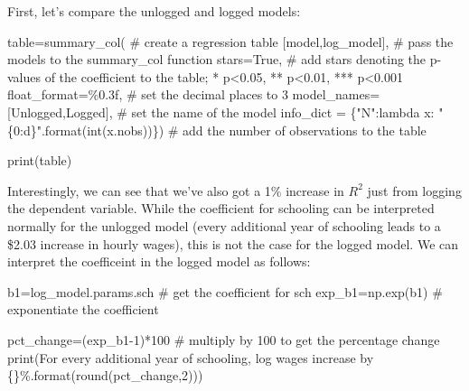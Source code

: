 \documentclass[
  letterpaper,
  DIV=11,
  numbers=noendperiod]{scrreprt}
\newenvironment{Shaded}{\begin{snugshade}}{\end{snugshade}}
\newcommand{\BuiltInTok}[1]{\textcolor[rgb]{0.00,0.23,0.31}{#1}}
\newcommand{\CommentTok}[1]{\textcolor[rgb]{0.37,0.37,0.37}{#1}}
\newcommand{\DecValTok}[1]{\textcolor[rgb]{0.68,0.00,0.00}{#1}}
\newcommand{\KeywordTok}[1]{\textcolor[rgb]{0.00,0.23,0.31}{#1}}
\newcommand{\NormalTok}[1]{\textcolor[rgb]{0.00,0.23,0.31}{#1}}
\newcommand{\OperatorTok}[1]{\textcolor[rgb]{0.37,0.37,0.37}{#1}}
\newcommand{\SpecialCharTok}[1]{\textcolor[rgb]{0.37,0.37,0.37}{#1}}
\newcommand{\StringTok}[1]{\textcolor[rgb]{0.13,0.47,0.30}{#1}}
\newcommand{\VariableTok}[1]{\textcolor[rgb]{0.07,0.07,0.07}{#1}}
\begin{document}
First, let's compare the unlogged and logged models:

\begin{Shaded}
\begin{Highlighting}[]
\NormalTok{table}\OperatorTok{=}\NormalTok{summary\_col( }\CommentTok{\# create a regression table }
\NormalTok{    [model,log\_model], }\CommentTok{\# pass the models to the summary\_col function}
\NormalTok{    stars}\OperatorTok{=}\VariableTok{True}\NormalTok{, }\CommentTok{\# add stars denoting the p{-}values of the coefficient to the table; * p\textless{}0.05, ** p\textless{}0.01, *** p\textless{}0.001}
\NormalTok{    float\_format}\OperatorTok{=}\StringTok{\textquotesingle{}}\SpecialCharTok{\%0.3f}\StringTok{\textquotesingle{}}\NormalTok{, }\CommentTok{\# set the decimal places to 3}
\NormalTok{    model\_names}\OperatorTok{=}\NormalTok{[}\StringTok{\textquotesingle{}Unlogged\textquotesingle{}}\NormalTok{,}\StringTok{\textquotesingle{}Logged\textquotesingle{}}\NormalTok{], }\CommentTok{\# set the name of the model}
\NormalTok{    info\_dict }\OperatorTok{=}\NormalTok{ \{}\StringTok{"N"}\NormalTok{:}\KeywordTok{lambda}\NormalTok{ x: }\StringTok{"}\SpecialCharTok{\{0:d\}}\StringTok{"}\NormalTok{.}\BuiltInTok{format}\NormalTok{(}\BuiltInTok{int}\NormalTok{(x.nobs))\}) }\CommentTok{\# add the number of observations to the table}

\BuiltInTok{print}\NormalTok{(table)}
\end{Highlighting}
\end{Shaded}

Interestingly, we can see that we've also got a 1\% increase in \(R^2\)
just from logging the dependent variable. While the coefficient for
schooling can be interpreted normally for the unlogged model (every
additional year of schooling leads to a \$2.03 increase in hourly
wages), this is not the case for the logged model. We can interpret the
coefficeint in the logged model as follows:

\begin{Shaded}
\begin{Highlighting}[]
\NormalTok{b1}\OperatorTok{=}\NormalTok{log\_model.params.sch }\CommentTok{\# get the coefficient for sch}
\NormalTok{exp\_b1}\OperatorTok{=}\NormalTok{np.exp(b1) }\CommentTok{\# exponentiate the coefficient}

\NormalTok{pct\_change}\OperatorTok{=}\NormalTok{(exp\_b1}\OperatorTok{{-}}\DecValTok{1}\NormalTok{)}\OperatorTok{*}\DecValTok{100} \CommentTok{\# multiply by 100 to get the percentage change}
\BuiltInTok{print}\NormalTok{(}\StringTok{\textquotesingle{}For every additional year of schooling, log wages increase by }\SpecialCharTok{\{\}}\StringTok{\%\textquotesingle{}}\NormalTok{.}\BuiltInTok{format}\NormalTok{(}\BuiltInTok{round}\NormalTok{(pct\_change,}\DecValTok{2}\NormalTok{)))}
\end{Highlighting}
\end{Shaded}
\end{document}
